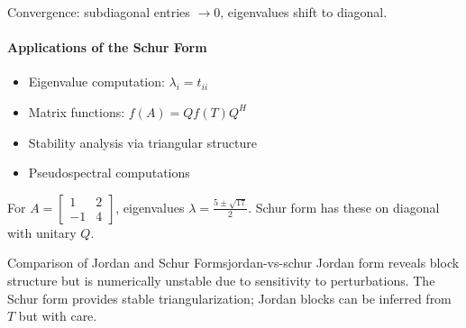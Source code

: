 \documentclass[../../main.tex]{subfiles}
\begin{document}
Convergence: subdiagonal entries $\to 0$, eigenvalues shift to diagonal.

\paragraph{Applications of the Schur Form}

\begin{itemize}
    \item Eigenvalue computation: $\lambda_i = t_{ii}$
    \item Matrix functions: $f(A) = Q f(T) Q^H$
    \item Stability analysis via triangular structure
    \item Pseudospectral computations
\end{itemize}

\begin{example}{}
    For $A = \begin{bmatrix} 1 & 2 \\ -1 & 4 \end{bmatrix}$, eigenvalues $\lambda = \frac{5 \pm \sqrt{17}}{2}$. Schur form has these on diagonal with unitary $Q$.
\end{example}

\begin{remark}{Comparison of Jordan and Schur Forms}{jordan-vs-schur}
    Jordan form reveals block structure but is numerically unstable due to sensitivity to perturbations. The
    Schur form provides stable triangularization; Jordan blocks can be inferred from $T$ but with care.
\end{remark}
\end{document}
